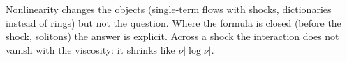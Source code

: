 \begin{keypoint}
Nonlinearity changes the objects (single-term flows with shocks, dictionaries instead of rings) but not the question. Where the formula is closed (before the shock, solitons) the answer is explicit. Across a shock the interaction does not vanish with the viscosity: it shrinks like $\nu|\log\nu|$.
\end{keypoint}

